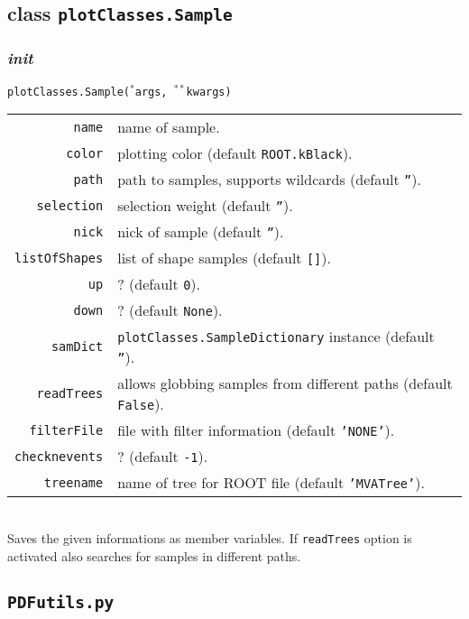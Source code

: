 \documentclass[12pt, a4paper]{article}
\newcommand{\args}{$^*$args}
\newcommand{\kwargs}{$^{**}$kwargs}
\begin{document}
\subsection{class \texttt{plotClasses.Sample}}

\subsubsection{\textit{init}}
\texttt{plotClasses.Sample(\args, \kwargs)}\\
\begin{tabular}{r|l}
\hline
\texttt{name}			&	name of sample. \\
\texttt{color}			&	plotting color (default \texttt{ROOT.kBlack}).\\
\texttt{path}			&	path to samples, supports wildcards (default \texttt{''}).\\
\texttt{selection}		&	selection weight (default \texttt{''}).\\
\texttt{nick}			&	nick of sample (default \texttt{''}). \\
\texttt{listOfShapes}	&	list of shape samples (default \texttt{[]}).\\
\texttt{up}				&	? (default \texttt{0}).\\
\texttt{down}			&	? (default \texttt{None}).\\
\texttt{samDict}		&	\texttt{plotClasses.SampleDictionary} instance (default \texttt{''}).\\
\texttt{readTrees}		&	allows globbing samples from different paths (default \texttt{False}).\\
\texttt{filterFile}		&	file with filter information (default \texttt{'NONE'}).\\
\texttt{checknevents}	&	? (default \texttt{-1}).\\
\texttt{treename}		&	name of tree for ROOT file (default \texttt{'MVATree'}).\\
\hline
\end{tabular}
\\
Saves the given informations as member variables. If \texttt{readTrees} option is activated also searches for samples in different paths.




\subsection{\texttt{PDFutils.py}}
\label{pdfutils}
\end{document}
